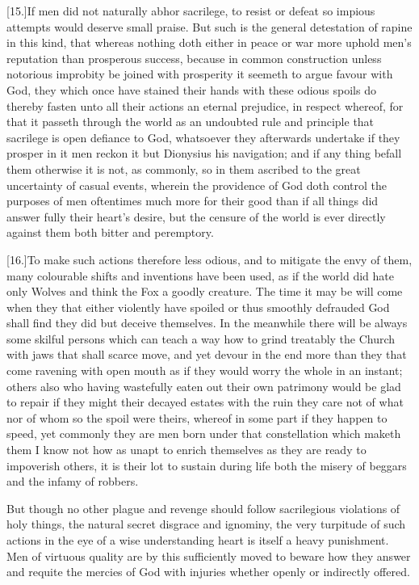 [15.]If men did not naturally abhor sacrilege, to resist or defeat so impious attempts would deserve small praise. But such is the general detestation of rapine in this kind, that whereas nothing doth either in peace or war more uphold men’s reputation than prosperous success, because in common construction unless notorious improbity be joined with prosperity it seemeth to argue favour with God, they which once have stained their hands with these odious spoils do thereby fasten unto all their actions an eternal prejudice, in respect whereof, for that it passeth through the world as an undoubted rule and principle that sacrilege is open defiance to God, whatsoever they afterwards undertake if they prosper in it men reckon it but Dionysius his navigation; and if any thing befall them otherwise it is not, as commonly, so in them ascribed to the great uncertainty of casual events, wherein the providence of God doth control the purposes of men oftentimes much more for their good than if all things did answer fully their heart’s desire, but the censure of the world is ever directly against them both bitter and peremptory.




[16.]To make such actions therefore less odious, and to mitigate the envy of them, many colourable shifts and inventions have been used, as if the world did hate only Wolves and think the Fox a goodly creature. The time it may be will come when they that either violently have spoiled or thus smoothly defrauded God shall find they did but deceive themselves. In the meanwhile there will be always some skilful persons which can teach a way how to grind treatably the Church with jaws that shall scarce move, and yet devour in the end more than they that come ravening with open mouth as if they would worry the whole in an instant; others also who having wastefully eaten out their own patrimony would be glad to repair if they might their decayed estates with the ruin they care not of what nor of whom so the spoil were theirs, whereof in some part if they happen to speed, yet commonly they are men born under that constellation which maketh them I know not how as unapt to enrich themselves as they are ready to impoverish others, it is their lot to sustain during life both the misery of beggars and the infamy of robbers.

But though no other plague and revenge should follow sacrilegious violations of holy things, the natural secret disgrace and ignominy, the very turpitude of such actions in the eye of a wise understanding heart is itself a heavy punishment. Men of virtuous quality are by this sufficiently  moved to beware how they answer and requite the mercies of God with injuries whether openly or indirectly offered.


